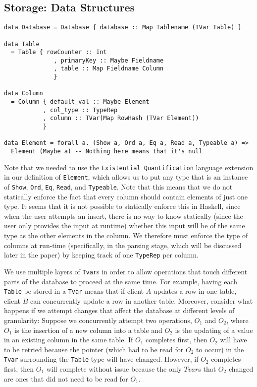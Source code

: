 \documentclass[10pt]{article}
\begin{document}
\begin{multicols}{2}
\section{Storage: Data Structures}

\noindent\begin{minipage}{.45\textwidth}
\begin{lstlisting}[caption=The data structures used to build up a table.,frame=tlrb, breaklines=true]
data Database = Database { database :: Map Tablename (TVar Table) }

data Table 
  = Table { rowCounter :: Int 
              , primaryKey :: Maybe Fieldname 
              , table :: Map Fieldname Column
              }

data Column 
  = Column { default_val :: Maybe Element
           , col_type :: TypeRep
           , column :: TVar(Map RowHash (TVar Element))
           } 

data Element = forall a. (Show a, Ord a, Eq a, Read a, Typeable a) => 
  Element (Maybe a) -- Nothing here means that it's null
\end{lstlisting}
\end{minipage}\hfill

Note that we needed to use the \texttt{Existential Quantification} language extension in our definition of \texttt{Element}, which allows us to put any type that is an instance of \texttt{Show}, \texttt{Ord}, \texttt{Eq}, \texttt{Read}, and \texttt{Typeable}.  Note that this means that we do not statically enforce the fact that every column should contain elements of just one type. It seems that it is not possible to statically enforce this in Haskell, since when the user attempts an insert, there is no way to know statically (since the user only provides the input at runtime) whether this input will be of the same type as the other elements in the column. We therefore must enforce the type of columns at run-time (specifically, in the parsing stage, which will be discussed later in the paper) by keeping track of one \texttt{TypeRep} per column. 

We use multiple layers of \texttt{Tvar}s in order to allow operations that touch different parts of the database to proceed at the same time. For example, having each \texttt{Table} be stored in a \texttt{Tvar} means that if client $A$ updates a row in one table, client $B$ can concurrently update a row in another table. Moreover, consider what happens if we attempt changes that affect the database at different levels of granularity: Suppose we concurrently attempt two operations, $O_1$ and $O_2$, where $O_1$ is the insertion of a new column into a table and $O_2$ is the updating of a value in an existing column in the same table. If $O_1$ completes first, then $O_2$ will have to be retried because the pointer (which had to be read for $O_2$ to occur) in the \texttt{Tvar} surrounding the \texttt{Table} type will have changed. However, if $O_2$ completes first, then $O_1$ will complete without issue because the only $Tvar$s that $O_2$ changed are ones that did not need to be read for $O_1$. 



\end{multicols}
\end{document}
